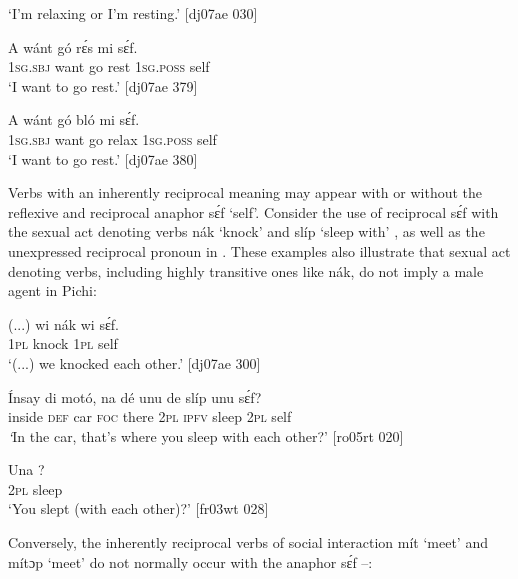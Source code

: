 \glt ‘I’m relaxing or I’m resting.’ [dj07ae 030]
\z


\ea%
    \label{ex:key:1308}
    \gll A    wánt  gó  rɛ́s  mi    sɛ́f.\\
\textsc{1sg.sbj}  want  go  rest  \textsc{1sg.poss}  self\\

\glt ‘I want to go rest.’ [dj07ae 379]
\z


\ea%
    \label{ex:key:1309}
    \gll A    wánt  gó  bló    mi    sɛ́f.\\
\textsc{1sg.sbj}  want  go  relax  \textsc{1sg.poss}  self\\

\glt ‘I want to go rest.’ [dj07ae 380]
\z

Verbs with an inherently reciprocal meaning may appear with or without the reflexive and reciprocal anaphor sɛ́f ‘self’. Consider the use of reciprocal sɛ́f with the sexual act denoting verbs nák ‘knock’  and slíp ‘sleep with’ , as well as the unexpressed reciprocal pronoun in . These examples also illustrate that sexual act denoting verbs, including highly transitive ones like nák, do not imply a male agent in Pichi:


\ea%
    \label{ex:key:1310}
    \gll (...)  wi  nák    wi  sɛ́f.\\
  {} \textsc{1pl}  knock  \textsc{1pl}  self\\

\glt ‘(...) we knocked each other.’ [dj07ae 300]
\z


\ea%
    \label{ex:key:1311}
    \gll \'{I}nsay  di  motó,  na  dé    unu  de  slíp    unu  sɛ́f?\\
inside  \textsc{def}  car    \textsc{foc}  there  \textsc{2pl}  \textsc{ipfv}  sleep  \textsc{2pl}  self\\

\glt \textit{‘}In the car, that’s where you sleep with each other?’ [ro05rt 020]
\z


\ea%
    \label{ex:key:1312}
    \gll Una    ?\\
\textsc{2pl}    sleep\\

\glt ‘You slept (with each other)?’ [fr03wt 028]
\z

Conversely, the inherently reciprocal verbs of social interaction mít ‘meet’ and mítɔp ‘meet’ do not normally occur with the anaphor sɛ́f –: 


